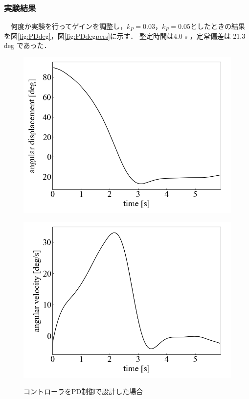 \subsubsection{実験結果}
　何度か実験を行ってゲインを調整し，$k_P=0.03$，$k_P=0.05$としたときの結果を図\ref{fig:PDdeg}，図\ref{fig:PDdegpers}に示す．
整定時間は4.0 s ，定常偏差は-21.3 deg であった．
\begin{figure}[h]
	\centering
	\begin{minipage}{0.43\columnwidth}
	  \centering
	  \includegraphics[width=\columnwidth]{./figure/PDdeg.png}
	  \label{fig:PDdeg}
	\end{minipage}
	\hspace{5mm}
	\begin{minipage}{0.43\columnwidth}
	  \centering
	  \includegraphics[width=\columnwidth]{./figure/PDdegpers.png}
	  \label{fig:PDdegpers}
	\end{minipage}
	\caption{コントローラをPD制御で設計した場合}
	\label{fig:PD}
  \end{figure}

